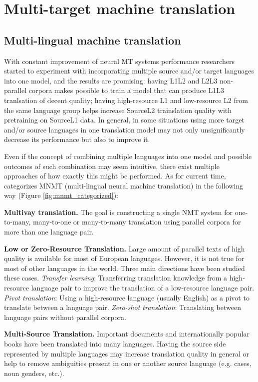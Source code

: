\section{Multi-target machine translation}
\label{section:multitarget_mt}

\subsection{Multi-lingual machine translation}

With constant improvement of neural MT systems performance researchers started to
experiment with incorporating multiple source and/or target languages into one model,
and the results are promising: having L1\to{}L2 and L2\to{}L3 non-parallel
corpora makes possible to train a model that can produce L1\to{}L3 tranlsation
of decent quality; having high-resource L1 and low-resource L2 from the same language
group helps increase Source\to{}L2 trainslation quality with pretraining on
Source\to{}L1 data.
In general, in some situations using more target and/or source languages in one translation
model may not only unsignificantly decrease its performance but also to improve it.

Even if the concept of combining multiple languages into one model and possible outcomes
of such combination may seem intuitive, there exist multiple approaches of how exactly
this might be performed. As for current time, \cite{Dabre2019} categorizes
MNMT (multi-lingual neural machine translation) in the following way
(Figure \ref{fig:mnmt_categorized}):

\textbf{Multivay translation.}
The goal is constructing a single NMT system for one-to-many, many-to-one or many-to-many
translation using parallel corpora for more than one language pair.

\textbf{Low or Zero-Resource Translation.}
Large amount of parallel texts of high quality is available for most of European
languages. However, it is not true for most of other languages in the world.
Three main directions have been studied these cases.
\textit{Transfer learning}: Transferring translation knowledge from a high-resource language pair
to improve the translation of a low-resource language pair.
\textit{Pivot translation}: Using a high-resource language (usually English) as a pivot to translate
between a language pair.
\textit{Zero-shot translation}: Translating between language pairs without parallel corpora.

\textbf{Multi-Source Translation.} Important documents and internationally popular books have
been translated into many languages. Having the source side represented by multiple languages
may increase translation quality in general or help to remove ambiguities present in one or another
source language (e.g. cases, noun genders, etc.).


